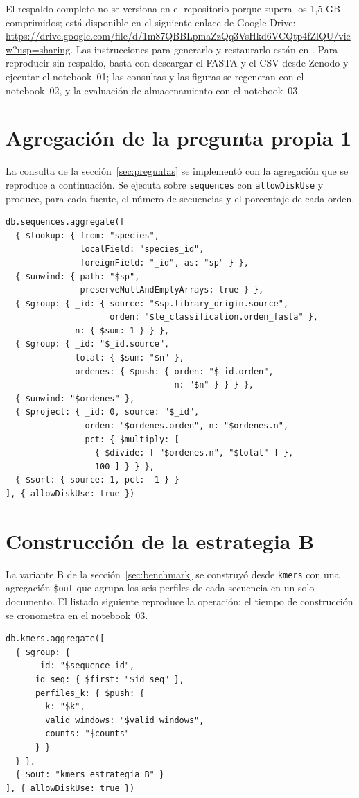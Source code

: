 \documentclass[journal]{IEEEtran}
\begin{document}
El respaldo completo no se versiona en el repositorio porque supera los 1,5 GB comprimidos;
está disponible en el siguiente enlace de Google Drive:
\url{https://drive.google.com/file/d/1m87QBBLpmaZzQq3VsHkd6VCQtp4fZlQU/view?usp=sharing}.
Las instrucciones para generarlo y restaurarlo están en . Para
reproducir sin respaldo, basta con descargar el FASTA y el CSV desde Zenodo y ejecutar el
notebook~01; las consultas y las figuras se regeneran con el notebook~02, y la evaluación de
almacenamiento con el notebook~03.

\appendices
\section{Agregación de la pregunta propia 1}
\label{app:agregacion}
La consulta de la sección~\ref{sec:preguntas} se implementó con la agregación que se
reproduce a continuación. Se ejecuta sobre \texttt{sequences} con \texttt{allowDiskUse} y
produce, para cada fuente, el número de secuencias y el porcentaje de cada orden.
\begin{lstlisting}
db.sequences.aggregate([
  { $lookup: { from: "species",
               localField: "species_id",
               foreignField: "_id", as: "sp" } },
  { $unwind: { path: "$sp",
               preserveNullAndEmptyArrays: true } },
  { $group: { _id: { source: "$sp.library_origin.source",
                     orden: "$te_classification.orden_fasta" },
              n: { $sum: 1 } } },
  { $group: { _id: "$_id.source",
              total: { $sum: "$n" },
              ordenes: { $push: { orden: "$_id.orden",
                                  n: "$n" } } } },
  { $unwind: "$ordenes" },
  { $project: { _id: 0, source: "$_id",
                orden: "$ordenes.orden", n: "$ordenes.n",
                pct: { $multiply: [
                  { $divide: [ "$ordenes.n", "$total" ] },
                  100 ] } } },
  { $sort: { source: 1, pct: -1 } }
], { allowDiskUse: true })
\end{lstlisting}

\clearpage
\section{Construcción de la estrategia B}
\label{app:estrategia_b}
La variante B de la sección~\ref{sec:benchmark} se construyó desde \texttt{kmers} con una
agregación \texttt{\$out} que agrupa los seis perfiles de cada secuencia en un solo
documento. El listado siguiente reproduce la operación; el tiempo de construcción se
cronometra en el notebook~03.
\begin{lstlisting}
db.kmers.aggregate([
  { $group: {
      _id: "$sequence_id",
      id_seq: { $first: "$id_seq" },
      perfiles_k: { $push: {
        k: "$k",
        valid_windows: "$valid_windows",
        counts: "$counts"
      } }
  } },
  { $out: "kmers_estrategia_B" }
], { allowDiskUse: true })
\end{lstlisting}



\end{document}
